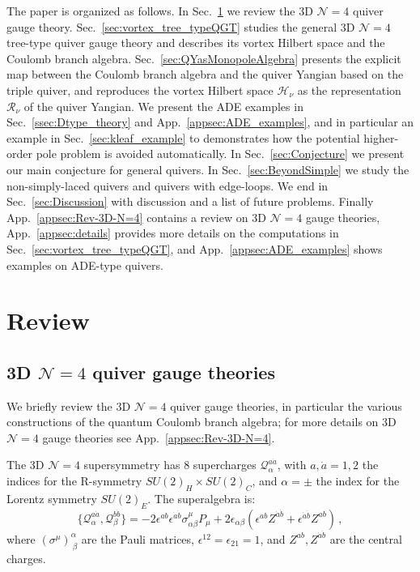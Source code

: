 \documentclass[12pt,a4paper]{article}
\renewcommand{\(}{\left(}
\renewcommand{\)}{\right)}
\renewcommand{\(}{\left(}
\renewcommand{\)}{\right)}
\begin{document}
\medskip

The paper is organized as follows. 
In Sec.~\ref{sec:Review} we review the 3D $\mathcal{N}=4$ quiver gauge theory.
Sec.~\ref{sec:vortex_tree_typeQGT} studies the general 3D $\mathcal{N}=4$ tree-type quiver gauge theory and describes its vortex Hilbert space and the Coulomb branch algebra.
Sec.~\ref{sec:QYasMonopoleAlgebra} presents the explicit map between the Coulomb branch algebra and the quiver Yangian based on the triple quiver, and reproduces the vortex Hilbert space $\mathcal{H}_{\nu}$ as the representation $\mathcal{R}_{\nu}$ of the quiver Yangian. 
We present the ADE examples  in Sec.~\ref{ssec:Dtype_theory} and App.~\ref{appsec:ADE_examples}, and in particular an example in Sec.~\ref{sec:kleaf_example} to demonstrates how the potential higher-order pole problem is avoided automatically.
In Sec.~\ref{sec:Conjecture} we present our main conjecture for general quivers.
In Sec.~\ref{sec:BeyondSimple} we study the non-simply-laced quivers and quivers with edge-loops.
We end in Sec.~\ref{sec:Discussion} with discussion and a list of future problems. 
Finally App.~\ref{appsec:Rev-3D-N=4} contains a review on 3D $\mathcal{N}=4$ gauge theories, App.~\ref{appsec:details} provides more details on the computations in Sec.~\ref{sec:vortex_tree_typeQGT}, and App.~\ref{appsec:ADE_examples} 
shows examples on ADE-type quivers.

\section{Review}
\label{sec:Review}
\subsection{\texorpdfstring{3D $\mathcal{N}=4$ quiver gauge theories}{3D N=4 quiver gauge theories}}
\label{ssec:3DN=4QGT}

We briefly review the 3D $\mathcal{N}=4$ quiver gauge theories, in particular the various constructions of the quantum Coulomb branch algebra; for more details on 3D $\mathcal{N}=4$ gauge theories see App.~\ref{appsec:Rev-3D-N=4}.  


\medskip

The 3D $\mathcal{N}=4$ supersymmetry has 8 supercharges $\mathcal{Q}_\alpha^{a\dot{a}}$, with $a,\dot{a}=1,2$ the indices for the R-symmetry $SU(2)_H\times SU(2)_C$, and $\alpha=\pm$ the index for the Lorentz symmetry $SU(2)_E$. 
The superalgebra is:
\begin{equation}
\{\mathcal{Q}_\alpha^{a\dot{a}},\mathcal{Q}_\beta^{b\dot{b}}\}
=-2\epsilon^{ab}\epsilon^{\dot{a}\dot{b}}\sigma^\mu_{\alpha\beta}P_\mu+2\epsilon_{\alpha\beta}(\epsilon^{ab}Z^{\dot{a}\dot{b}}+\epsilon^{\dot{a}\dot{b}}Z^{ab})\,,
\end{equation}
where $(\sigma^{\mu})^{\alpha}_{\ \beta}$ are the Pauli matrices, $\epsilon^{12}=\epsilon_{21}=1$, and $Z^{ab},Z^{\dot{a}\dot{b}}$ are the central charges.
\end{document}

